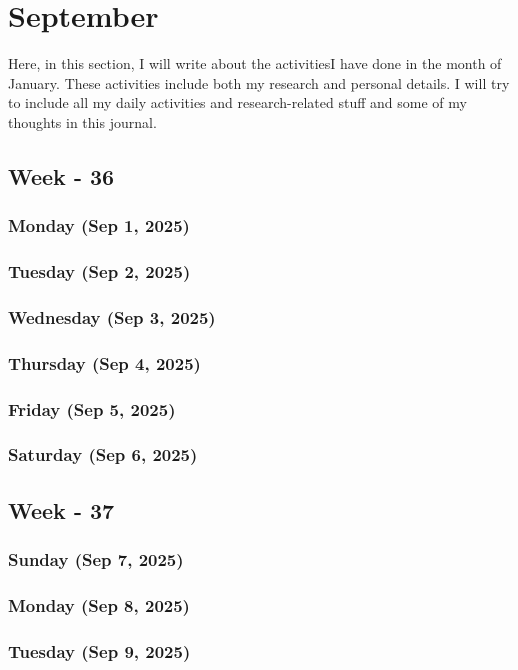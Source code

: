 \chapter{September}
\label{chap:September}
\hspace{1cm}
Here, in this section, I will write about the activities\cite{zhou2015}I have done in the month of January. These activities include both my research and personal details. I will try to include all my daily activities and research-related stuff and some of my thoughts in this journal.

\section{Week - 36}
\subsection*{Monday (Sep 1, 2025)}
\subsection*{Tuesday (Sep 2, 2025)}
\subsection*{Wednesday (Sep 3, 2025)}
\subsection*{Thursday (Sep 4, 2025)}
\subsection*{Friday (Sep 5, 2025)}
\subsection*{Saturday (Sep 6, 2025)}

\section{Week - 37}
\subsection*{Sunday (Sep 7, 2025)}
\subsection*{Monday (Sep 8, 2025)}
\subsection*{Tuesday (Sep 9, 2025)}
